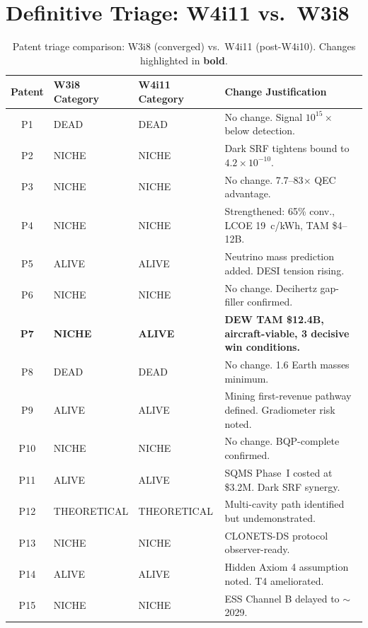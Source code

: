 \documentclass[11pt]{article}
\newcommand{\ee}[1]{\times 10^{#1}}
\begin{document}
\section{Definitive Triage: W4i11 vs.\ W3i8}
\label{sec:triage-table}

\begin{table}[H]
\centering
\caption{Patent triage comparison: W3i8 (converged) vs.\ W4i11 (post-W4i10).
  Changes highlighted in \textbf{bold}.}
\label{tab:triage}
\begin{tabular}{@{}clll@{}}
\toprule
Patent & W3i8 Category & W4i11 Category & Change Justification \\
\midrule
P1  & DEAD & DEAD & No change. Signal $10^{15}\times$ below detection. \\
P2  & NICHE & NICHE & Dark SRF tightens bound to $4.2\ee{-10}$. \\
P3  & NICHE & NICHE & No change. 7.7--83$\times$ QEC advantage. \\
P4  & NICHE & NICHE & Strengthened: 65\% conv., LCOE 19~c/kWh, TAM \$4--12B. \\
P5  & ALIVE & ALIVE & Neutrino mass prediction added. DESI tension rising. \\
P6  & NICHE & NICHE & No change. Decihertz gap-filler confirmed. \\
\textbf{P7} & \textbf{NICHE} & \textbf{ALIVE} & \textbf{DEW TAM \$12.4B, aircraft-viable, 3 decisive win conditions.} \\
P8  & DEAD & DEAD & No change. 1.6 Earth masses minimum. \\
P9  & ALIVE & ALIVE & Mining first-revenue pathway defined. Gradiometer risk noted. \\
P10 & NICHE & NICHE & No change. BQP-complete confirmed. \\
P11 & ALIVE & ALIVE & SQMS Phase~I costed at \$3.2M. Dark SRF synergy. \\
P12 & THEORETICAL & THEORETICAL & Multi-cavity path identified but undemonstrated. \\
P13 & NICHE & NICHE & CLONETS-DS protocol observer-ready. \\
P14 & ALIVE & ALIVE & Hidden Axiom 4 assumption noted. T4 ameliorated. \\
P15 & NICHE & NICHE & ESS Channel B delayed to $\sim$2029. \\
\bottomrule
\end{tabular}
\end{table}
\end{document}
